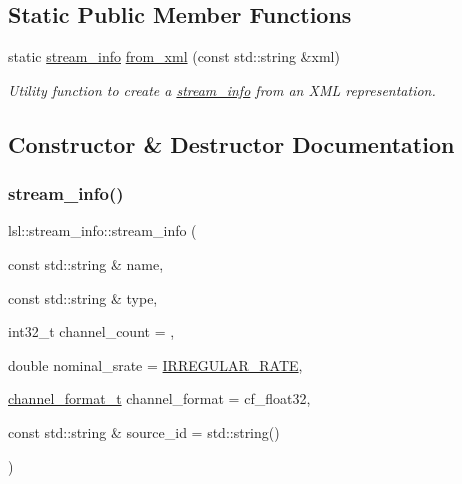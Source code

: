 \subsection*{Static Public Member Functions}
\begin{DoxyCompactItemize}
\item 
\mbox{\label{classlsl_1_1stream__info_abf8fb6ba88d2f6c4069961149f18faec}} 
static \hyperlink{classlsl_1_1stream__info}{stream\+\_\+info} \hyperlink{classlsl_1_1stream__info_abf8fb6ba88d2f6c4069961149f18faec}{from\+\_\+xml} (const std\+::string \&xml)
\begin{DoxyCompactList}\small\item\em Utility function to create a \hyperlink{classlsl_1_1stream__info}{stream\+\_\+info} from an X\+ML representation. \end{DoxyCompactList}\end{DoxyCompactItemize}


\subsection{Constructor \& Destructor Documentation}
\mbox{\label{classlsl_1_1stream__info_a874f4899da89168b768cfe9acdd569a0}} 
\subsubsection{\texorpdfstring{stream\+\_\+info()}{stream\_info()}}
{\footnotesize\ttfamily lsl\+::stream\+\_\+info\+::stream\+\_\+info (\begin{DoxyParamCaption}\item[{const std\+::string \&}]{name,  }\item[{const std\+::string \&}]{type,  }\item[{int32\+\_\+t}]{channel\+\_\+count = {},  }\item[{double}]{nominal\+\_\+srate = {\ttfamily \hyperlink{namespacelsl_ac7ebddefe1091ef2d9459b6f9d79f7ab}{I\+R\+R\+E\+G\+U\+L\+A\+R\+\_\+\+R\+A\+TE}},  }\item[{\hyperlink{namespacelsl_a28d50dae6fd82eea8893ce3d63ccd46c}{channel\+\_\+format\+\_\+t}}]{channel\+\_\+format = {\ttfamily cf\+\_\+float32},  }\item[{const std\+::string \&}]{source\+\_\+id = {\ttfamily std\+:\+:string()} }\end{DoxyParamCaption})\hspace{0.3cm}{\ttfamily [inline]}}

